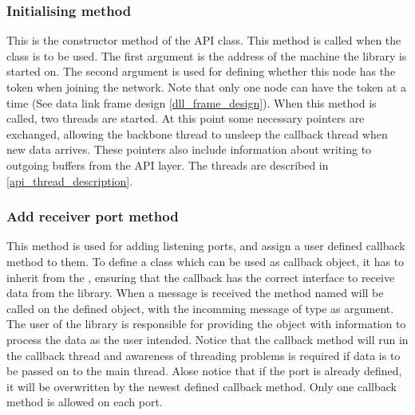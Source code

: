 \subsubsection{Initialising method}
This is the constructor method of the API class. This method is called when the class is to be used. The first argument is the address of the machine the library is started on. The second argument is used for defining whether this node has the token when joining the network. Note that only one node can have the token at a time (See data link frame design \ref{dll_frame_design}). When this method is called, two threads are started. At this point some necessary pointers are exchanged, allowing the backbone thread to unsleep the callback thread when new data arrives. These pointers also include information about writing to outgoing buffers from the API layer. The threads are described in \ref{api_thread_description}.

\subsubsection{Add receiver port method}
This method is used for adding listening ports, and assign a user defined callback method to them. To define a class which can be used as callback object, it has to inherit from the , ensuring that the callback has the correct interface to receive data from the library. When a message is received the method named  will be called on the defined object, with the incomming message of type  as argument. The user of the library is responsible for providing the object with information to process the data as the user intended. Notice that the callback method will run in the callback thread and awareness of threading problems is required if data is to be passed on to the main thread. Alose notice that if the port is already defined, it will be overwritten by the newest defined callback method. Only one callback method is allowed on each port.


